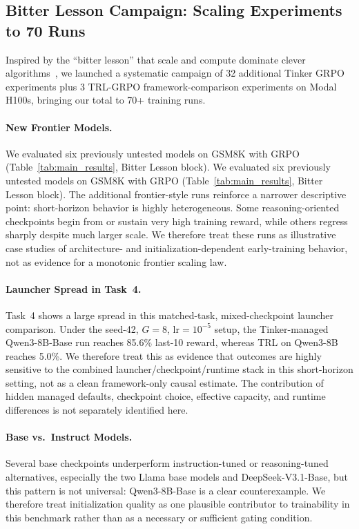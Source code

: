 \documentclass{article}
\begin{document}
\subsection{Bitter Lesson Campaign: Scaling Experiments to 70 Runs}
\label{sec:bitter_lesson}

Inspired by the ``bitter lesson'' that scale and compute dominate clever algorithms~\cite{schulman2017proximal}, we launched a systematic campaign of 32 additional Tinker GRPO experiments plus 3 TRL-GRPO framework-comparison experiments on Modal H100s, bringing our total to 70+ training runs.

\paragraph{New Frontier Models.}
We evaluated six previously untested models on GSM8K with GRPO (Table~\ref{tab:main_results}, Bitter Lesson block).
We evaluated six previously untested models on GSM8K with GRPO
(Table~\ref{tab:main_results}, Bitter Lesson block). The additional
frontier-style runs reinforce a narrower descriptive point: short-horizon
behavior is highly heterogeneous. Some reasoning-oriented checkpoints begin
from or sustain very high training reward, while others regress sharply despite
much larger scale. We therefore treat these runs as illustrative case studies
of architecture- and initialization-dependent early-training behavior, not as
evidence for a monotonic frontier scaling law.

\paragraph{Launcher Spread in Task~4.}
Task~4 shows a large spread in this matched-task, mixed-checkpoint launcher
comparison. Under the seed-42, $G=8$, lr$=10^{-5}$ setup, the Tinker-managed
Qwen3-8B-Base run reaches 85.6\% last-10 reward, whereas TRL on Qwen3-8B
reaches 5.0\%. We therefore treat this as evidence that outcomes are highly
sensitive to the combined launcher/checkpoint/runtime stack in this
short-horizon setting, not as a clean framework-only causal estimate. The
contribution of hidden managed defaults, checkpoint choice, effective
capacity, and runtime differences is not separately identified here.

\paragraph{Base vs.~Instruct Models.}
Several base checkpoints underperform instruction-tuned or reasoning-tuned
alternatives, especially the two Llama base models and DeepSeek-V3.1-Base, but
this pattern is not universal: Qwen3-8B-Base is a clear counterexample. We
therefore treat initialization quality as one plausible contributor to
trainability in this benchmark rather than as a necessary or sufficient gating
condition.
\end{document}
